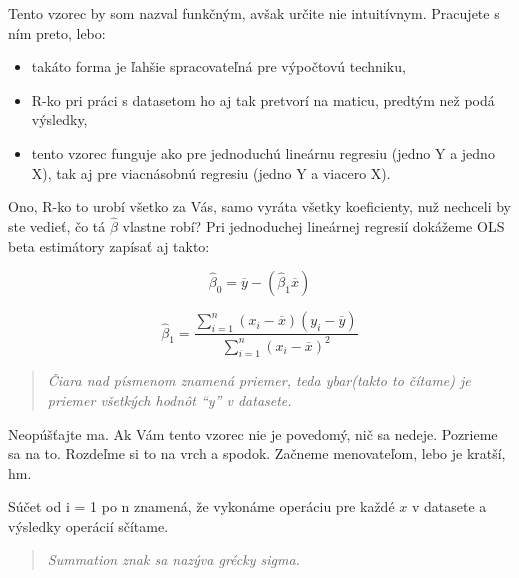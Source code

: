 \documentclass[]{article}
\newenvironment{Shaded}{\begin{snugshade}}{\end{snugshade}}
\newcommand{\CommentTok}[1]{\textcolor[rgb]{0.56,0.35,0.01}{\textit{#1}}}
\newcommand{\ErrorTok}[1]{\textcolor[rgb]{0.64,0.00,0.00}{\textbf{#1}}}
\newcommand{\KeywordTok}[1]{\textcolor[rgb]{0.13,0.29,0.53}{\textbf{#1}}}
\newcommand{\NormalTok}[1]{#1}
\newcommand{\OperatorTok}[1]{\textcolor[rgb]{0.81,0.36,0.00}{\textbf{#1}}}
\newcommand{\StringTok}[1]{\textcolor[rgb]{0.31,0.60,0.02}{#1}}
\providecommand{\tightlist}{%
  \setlength{\itemsep}{0pt}\setlength{\parskip}{0pt}}
\begin{document}
\begin{Shaded}
\end{Shaded}

Tento vzorec by som nazval funkčným, avšak určite nie intuitívnym.
Pracujete s ním preto, lebo:

\begin{itemize}
\tightlist
\item
  takáto forma je ľahšie spracovateľná pre výpočtovú techniku,
\item
  R-ko pri práci s datasetom ho aj tak pretvorí na maticu, predtým než
  podá výsledky,
\item
  tento vzorec funguje ako pre jednoduchú lineárnu regresiu (jedno Y a
  jedno X), tak aj pre viacnásobnú regresiu (jedno Y a viacero X).
\end{itemize}

Ono, R-ko to urobí všetko za Vás, samo vyráta všetky koeficienty, nuž
nechceli by ste vedieť, čo tá \(\hat\beta\) vlastne robí? Pri
jednoduchej lineárnej regresií dokážeme OLS beta estimátory zapísať aj
takto:

\[\hat\beta_0 = \overline{y} - (\hat\beta_1\overline{x})\]

\[\hat\beta_1 = \frac{\sum_{i=1}^{n} (x_i - \overline{x})(y_i - \overline{y})}{\sum_{i=1}^{n} (x_i - \overline{x})^2}\]

\begin{quote}
\emph{Čiara nad písmenom znamená priemer, teda ybar(takto to čítame) je
priemer všetkých hodnôt ``y'' v datasete.}
\end{quote}

Neopúšťajte ma. Ak Vám tento vzorec nie je povedomý, nič sa nedeje.
Pozrieme sa na to. Rozdeľme si to na vrch a spodok. Začneme menovateľom,
lebo je kratší, hm.

Súčet od i = 1 po n znamená, že vykonáme operáciu pre každé \(x\) v
datasete a výsledky operácií sčítame.

\begin{quote}
\emph{Summation znak sa nazýva grécky sigma.}
\end{quote}
\end{document}
